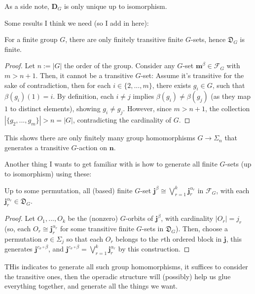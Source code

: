 \documentclass{article}
\begin{document}
As a side note, $\mathbf{D}_G$ is only unique up to isomorphism.

\hfil

Some results I think we need (so I add in here):

\begin{lem}
    For a finite group $G$, there are only finitely transitive finite $G$-sets, hence $\mathfrak{D}_G$ is finite.
\end{lem}
\begin{proof}
    Let $n:= |G|$ the order of the group. Consider any $G$-set $\mathbf{m}^\beta\in \mathscr{F}_G$ with $m>n+1$. Then, it cannot be a transitive $G$-set: Assume it's transitive for the sake of contradiction, then for each $i\in\{2,...,m\}$, there exists $g_i\in G$, such that $\beta(g_i)(1)=i$. By definition, each $i\neq j$ implies $\beta(g_i)\neq \beta(g_j)$ (as they map $1$ to distinct elements), showing $g_i\neq g_j$. However, since $m>n+1$, the collection $|\{g_2,...,g_m\}|>n=|G|$, contradicting the cardinality of $G$.
\end{proof}

This shows there are only finitely many group homomorphisms $G\rightarrow\Sigma_n$ that generates a transitive $G$-action on $\mathbf{n}$.

Another thing I wants to get familiar with is how to generate all finite $G$-sets (up to isomorphism) using these:
\begin{lem}
    Up to some permutation, all (based) finite $G$-set $\mathbf{j}^\beta\cong \bigvee_{r=1}^k \mathbf{j}_r^{\alpha_r}$ in $\mathscr{F}_G$, with each $\mathbf{j}_r^{\alpha_r}\in\mathfrak{D}_G$.
\end{lem}
\begin{proof}
    Let $O_1,...,O_k$ be the (nonzero) $G$-orbits of $\mathbf{j}^\beta$, with cardinality $|O_r|=j_r$ (so, each $O_r\cong \mathbf{j}_r^{\alpha_r}$ for some transitive finite $G$-sets in $\mathfrak{D}_G$). Then, choose a permutation $\sigma\in\Sigma_j$ so that each $O_r$ belongs to the $r$th ordered block in $\mathbf{j}$, this generates $\mathbf{j}^{c_\sigma\circ \beta}$, and $\mathbf{j}^{c_\sigma\circ \beta}=\bigvee_{r=1}^k\mathbf{j}_r^{\alpha_r}$ by this construction.
\end{proof}

THis indicates to generate all such group homomorphisms, it suffices to consider the transitive ones, then the operadic structure will (possibly) help us glue everything together, and generate all the things we want.
\end{document}
